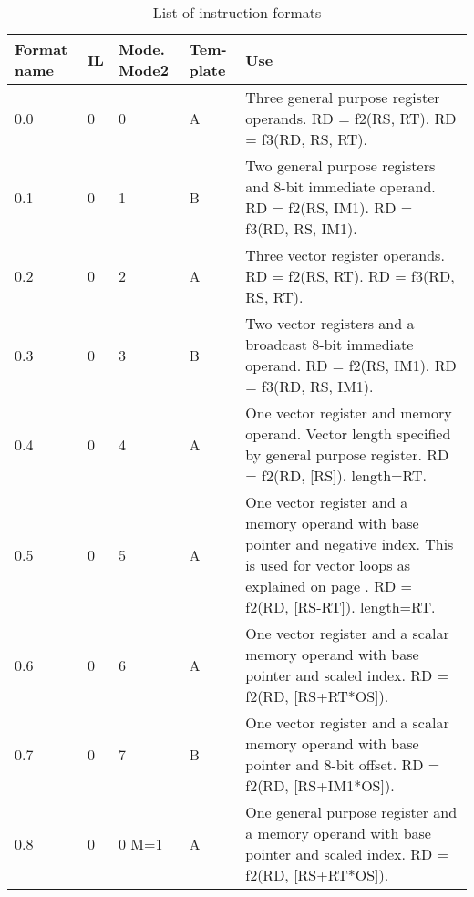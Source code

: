 \documentclass[forwardcom.tex]{subfiles}
\begin{document}
\begin{longtable} {|p{10mm}|p{6mm}|p{9mm}|p{7mm}|p{80mm}|}
\caption{List of instruction formats} \label{table:instructionFormats} \\
\endfirsthead
\endhead
\hline
\bfseries Format name & \bfseries IL & \bfseries Mode. \small Mode2 & \bfseries Tem-plate & \bfseries Use \\
\hline
0.0 & 0 & 0 & A & Three general purpose register operands.\newline 
RD = f2(RS, RT). RD = f3(RD, RS, RT).\\

\hline
0.1 & 0 & 1 & B & Two general purpose registers and 8-bit immediate operand. \newline
RD = f2(RS, IM1). RD = f3(RD, RS, IM1).\\

\hline
0.2 & 0 & 2 & A & Three vector register operands.\newline 
RD = f2(RS, RT). RD = f3(RD, RS, RT).\\

\hline
0.3 & 0 & 3 & B & Two vector registers and a broadcast 8-bit immediate operand. \newline
RD = f2(RS, IM1). RD = f3(RD, RS, IM1).\\

\hline
0.4 & 0 & 4 & A & One vector register and memory operand. Vector length specified by general purpose register. \newline
RD = f2(RD, [RS]). length=RT.\\

\hline
0.5 & 0 & 5 & A & One vector register and a memory operand with base pointer and negative index.  This is used for vector loops as explained on page \pageref{vectorLoops}. \newline
RD = f2(RD, [RS-RT]). length=RT.\\

\hline
0.6 & 0 & 6 & A & One vector register and a scalar memory operand with base pointer and scaled index. \newline
RD = f2(RD, [RS+RT*OS]).\\

\hline
0.7 & 0 & 7 & B & One vector register and a scalar memory operand with base pointer and 8-bit offset. \newline
RD = f2(RD, [RS+IM1*OS]).\\

\hline
0.8 & 0 & 0 M=1 & A & One general purpose register and a memory operand with base pointer and scaled index. \newline
RD = f2(RD, [RS+RT*OS]).\\


\end{longtable}
\end{document}
